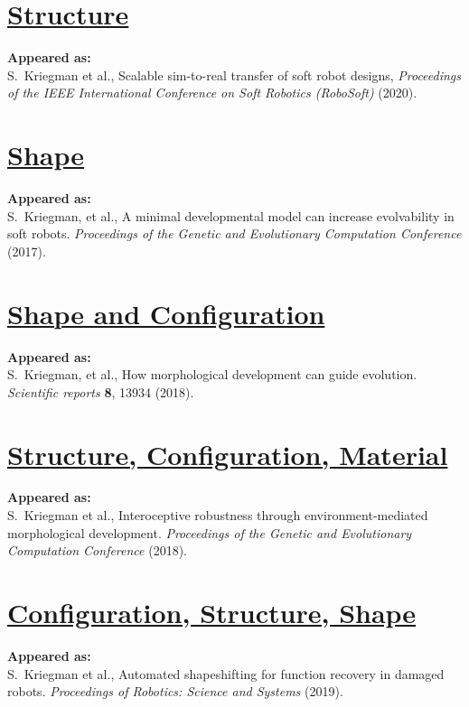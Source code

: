 \chapter{\href{https://ieeexplore.ieee.org/abstract/document/9116004}{\color{blue}Structure}}

\textbf{Appeared as:}\\
S.~Kriegman et al.,
Scalable sim-to-real transfer of soft robot designs,
\textit{Proceedings of the IEEE International Conference on Soft Robotics (RoboSoft)} (2020).


\chapter{\href{https://dl.acm.org/doi/abs/10.1145/3071178.3071296}{\color{blue}Shape}}

\textbf{Appeared as:}\\
S.~Kriegman, et al., A minimal developmental model can increase evolvability in soft robots. \textit{Proceedings of the Genetic and Evolutionary Computation Conference} (2017).


\chapter{\href{https://www.nature.com/articles/s41598-018-31868-7}{\color{blue}Shape and Configuration}}

\textbf{Appeared as:}\\
S.~Kriegman, et al., How morphological development can guide evolution. \textit{Scientific reports} \textbf{8}, 13934 (2018).


\chapter{\href{https://arxiv.org/abs/1804.02257}{\color{blue}Structure, Configuration, Material}}

\textbf{Appeared as:}\\
S.~Kriegman et al., Interoceptive robustness through environment-mediated morphological development. \textit{Proceedings of the Genetic and Evolutionary Computation Conference} (2018).


\chapter{\href{http://www.roboticsproceedings.org/rss15/p28.html}{\color{blue}Configuration, Structure, Shape}}

\textbf{Appeared as:}\\
S.~Kriegman et al., Automated shapeshifting for function recovery in damaged robots. \textit{Proceedings of Robotics: Science and Systems} (2019).



